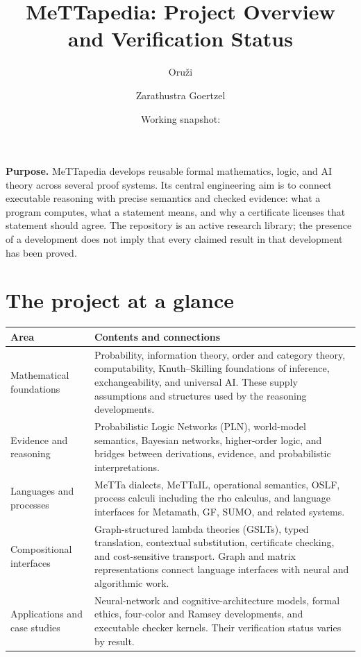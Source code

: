 \documentclass[10pt]{article}
\title{MeTTapedia: Project Overview and Verification Status}
\author{Oru\v{z}i \and Zarathustra Goertzel}
\date{Working snapshot: \statusdate}
\begin{document}
\maketitle
\vspace{-1.5em}

\textbf{Purpose.} MeTTapedia develops reusable formal mathematics, logic, and
AI theory across several proof systems. Its central engineering aim is to
connect executable reasoning with precise semantics and checked evidence:
what a program computes, what a statement means, and why a certificate
licenses that statement should agree. The repository is an active research
library; the presence of a development does not imply that every claimed
result in that development has been proved.

\section*{The project at a glance}

\begin{tabularx}{\linewidth}{@{}>{\raggedright\arraybackslash}p{.22\linewidth}X@{}}
\toprule
Area & Contents and connections \\
\midrule
Mathematical foundations & Probability, information theory, order and
category theory, computability, Knuth--Skilling foundations of inference,
exchangeability, and universal AI. These supply assumptions and structures
used by the reasoning developments. \\
Evidence and reasoning & Probabilistic Logic Networks (PLN), world-model
semantics, Bayesian networks, higher-order logic, and bridges between
derivations, evidence, and probabilistic interpretations. \\
Languages and processes & MeTTa dialects, MeTTaIL, operational semantics,
OSLF, process calculi including the rho calculus, and language interfaces
for Metamath, GF, SUMO, and related systems. \\
Compositional interfaces & Graph-structured lambda theories
(GSLTs), typed translation, contextual substitution, certificate checking,
and cost-sensitive transport. Graph and matrix representations connect
language interfaces with neural and algorithmic work. \\
Applications and case studies & Neural-network and cognitive-architecture
models, formal ethics, four-color and Ramsey developments, and executable
checker kernels. Their verification status varies by result. \\
\bottomrule
\end{tabularx}
\end{document}
